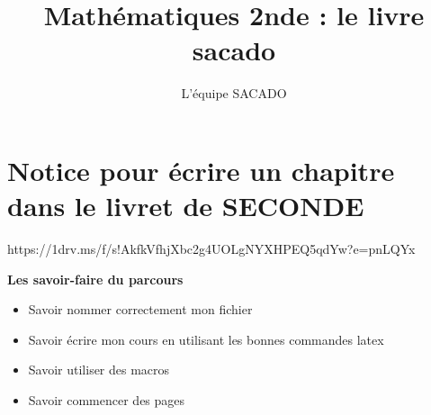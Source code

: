 



\title{Mathématiques 2nde  : le livre sacado}
\author{L'équipe SACADO}




\chapter{Notice pour écrire un chapitre dans le livret de SECONDE}
{https://1drv.ms/f/s!AkfkVfhjXbc2g4UOLgNYXHPEQ5qdYw?e=pnLQYx}
{
 \begin{CpsCol}
	\textbf{Les savoir-faire du parcours}
 	\begin{itemize}
 		\item Savoir nommer correctement mon fichier
 		\item Savoir écrire mon cours en utilisant les bonnes commandes latex
 		\item Savoir utiliser des macros
 		\item Savoir commencer des pages
 	\end{itemize}
 \end{CpsCol}
}
%
%
